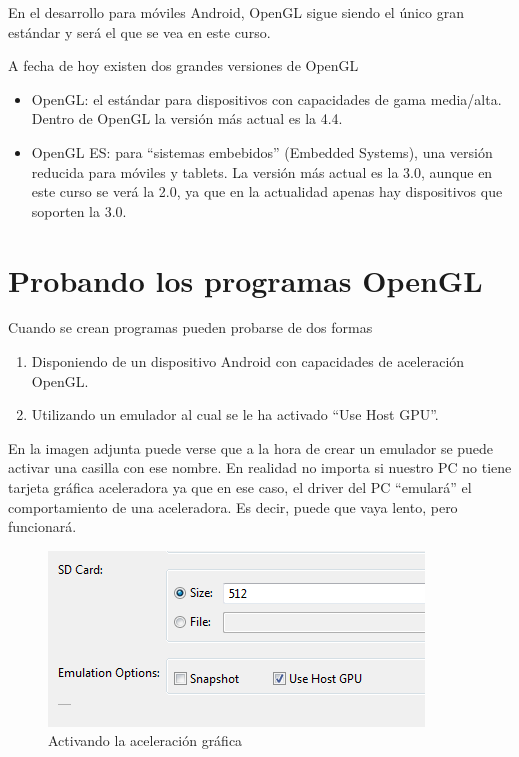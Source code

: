 \documentclass[a4paper,12pt,spanish]{sphinxmanual}
\begin{document}
En el desarrollo para móviles Android, OpenGL sigue siendo el único gran estándar y será el que se vea en este curso.

A fecha de hoy existen dos grandes versiones de OpenGL
\begin{itemize}
\item {} 
OpenGL: el estándar para dispositivos con capacidades de gama media/alta. Dentro de OpenGL la versión más actual es la 4.4.

\item {} 
OpenGL ES: para ``sistemas embebidos'' (Embedded Systems), una versión reducida para móviles y tablets. La versión más actual es la 3.0, aunque en este curso se verá la 2.0, ya que en la actualidad apenas hay dispositivos que soporten la 3.0.

\end{itemize}


\section{Probando los programas OpenGL}
\label{cap1opengl:probando-los-programas-opengl}
Cuando se crean programas pueden probarse de dos formas
\begin{enumerate}
\item {} 
Disponiendo de un dispositivo Android con capacidades de aceleración OpenGL.

\item {} 
Utilizando un emulador al cual se le ha activado ``Use Host GPU''.

\end{enumerate}

En la imagen adjunta puede verse que a la hora de crear un emulador se puede activar una casilla con ese nombre. En realidad no importa si nuestro PC no tiene tarjeta gráfica aceleradora ya que en ese caso, el driver del PC ``emulará'' el comportamiento de una aceleradora. Es decir, puede que vaya lento, pero funcionará.
\begin{figure}[htbp]
\centering
\capstart

\includegraphics{hostgpu.png}
\caption{Activando la aceleración gráfica}\end{figure}
\end{document}
